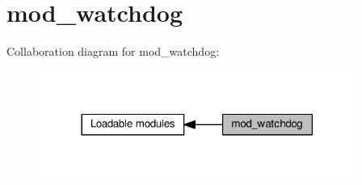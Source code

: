 \hypertarget{group__MOD__WATCHDOG}{}\section{mod\+\_\+watchdog}
\label{group__MOD__WATCHDOG}
Collaboration diagram for mod\+\_\+watchdog\+:
\nopagebreak
\begin{figure}[H]
\begin{center}
\leavevmode
\includegraphics[width=294pt]{group__MOD__WATCHDOG}
\end{center}
\end{figure}
